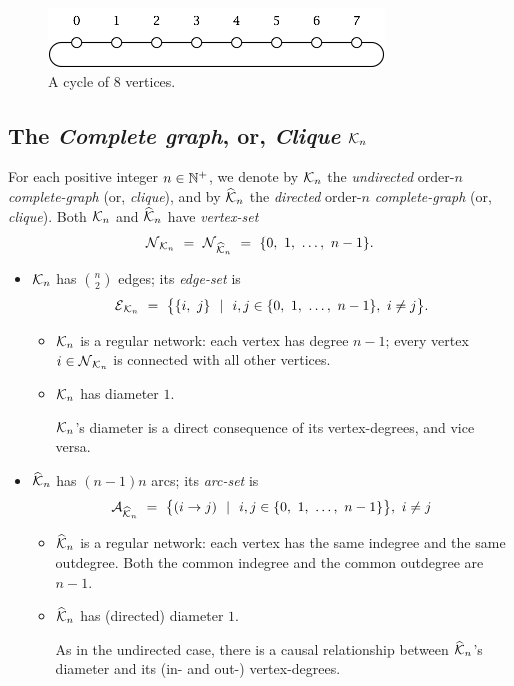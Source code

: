 \begin{figure}[hbt]
\begin{center}
       \includegraphics[scale=0.6]{FiguresGraph/cycle}
       \caption{A cycle of $8$ vertices.}
  \label{fig:cycle}
\end{center}
\end{figure}

\subsection{The {\it Complete graph}, or, {\it Clique} $\mbox{$\cal K$}_n$}
\label{sec:clique}
 

For each positive integer $n \in \mathbb{N}^+$, we denote by $\mbox{$\cal K$}_n$ the {\em
  undirected} order-$n$ {\it complete-graph} (or, {\it clique}),
  and by $\widehat{\mbox{$\cal K$}}_n$ the {\em
  directed} order-$n$ {\it complete-graph} (or, {\it clique}).  Both
$\mbox{$\cal K$}_n$ and $\widehat{\mbox{$\cal K$}}_n$ have {\it vertex-set}
\[ \mbox{$\cal N$}_{{\cal K}_n} \ = \ \mbox{$\cal N$}_{\widehat{{\cal K}}_n}
\ = \ \{ 0, \ 1, \ \ldots, \ n-1\}. \]
\begin{itemize}
\item
$\mbox{$\cal K$}_n$ has $\displaystyle {n \choose 2}$ edges; its {\it edge-set} is
\[ \mbox{$\cal E$}_{{\cal K}_n} \ = \
\big\{ \{i, \ j\} \ \ | \ \ i,j \in \{0, \ 1, \ \ldots, \ n-1\}, \ i
\neq j \big\}.
\]
  \begin{itemize}
  \item {} 
$\mbox{$\cal K$}_n$ is a regular network: each vertex has degree $n-1$; every vertex $i
\in \mbox{$\cal N$}_{\mbox{{\scriptsize $\cal K$}}_n}$ is connected with all other vertices.

   \item {}
$\mbox{$\cal K$}_n$ has diameter $1$.

$\mbox{$\cal K$}_n$'s diameter is a direct consequence of its vertex-degrees, and vice versa.
  \end{itemize}

\item
$\widehat{\mbox{$\cal K$}}_n$ has $(n-1)n$ arcs; its {\it arc-set} is
\[ \a_{\widehat{{\cal K}}_n} \ = \ 
\big\{ (i \rightarrow j) \ \ | \ \ i,j \in \{0, \ 1, \ \ldots, \ n-1\}
\big\}, \ i \neq j
\]
  \begin{itemize}
  \item
$\widehat{\mbox{$\cal K$}}_n$ is a regular network: each vertex has the same indegree
    and the same outdegree.  Both the common indegree and the common
    outdegree are $n-1$.
  \item
$\widehat{\mbox{$\cal K$}}_n$ has (directed) diameter $1$.

As in the undirected case, there is a causal relationship between
$\widehat{\mbox{$\cal K$}}_n$'s diameter and its (in- and out-) vertex-degrees.
  \end{itemize}
\end{itemize}


